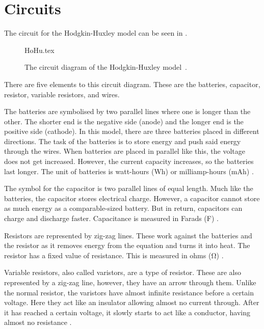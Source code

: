 \documentclass[../../Orator]{subfiles}
\begin{document}
 
 

\section{Circuits}
The circuit for the Hodgkin-Huxley model can be seen in . 

\begin{figure}[ht]
    \centering
    {HoHu.tex}
    \caption{The circuit diagram of the Hodgkin-Huxley model~\cite{HodHux1952}.}\label{fig:HHcircuit}
\end{figure}
There are five elements to this circuit diagram. These are the batteries, capacitor, resistor, variable resistors, and wires. 

The batteries are symbolised by two parallel lines where one is longer than the other. The shorter end is the negative side (anode) and the longer end is the positive side (cathode). In this model, there are three batteries placed in different directions. The task of the batteries is to store energy and push said energy through the wires. When batteries are placed in parallel like this, the voltage does not get increased. However, the current capacity increases, so the batteries last longer. The unit of batteries is watt-hours (Wh) or milliamp-hours (mAh) \cite{}. 

The symbol for the capacitor is two parallel lines of equal length. Much like the batteries, the capacitor stores electrical charge. However, a capacitor cannot store as much energy as a comparable-sized battery. But in return, capacitors can charge and discharge faster. Capacitance is measured in Farads (\unit{\farad}) \cite{}.

Resistors are represented by zig-zag lines. These work against the batteries and the resistor as it removes energy from the equation and turns it into heat. The resistor has a fixed value of resistance. This is measured in ohms (\unit{\ohm}) \cite{}.

Variable resistors, also called varistors, are a type of resistor. These are also represented by a zig-zag line, however, they have an arrow through them. Unlike the normal resistor, the varistors have almost infinite resistance before a certain voltage. Here they act like an insulator allowing almost no current through. After it has reached a certain voltage, it slowly starts to act like a conductor, having almost no resistance \cite{}. 
\end{document}
